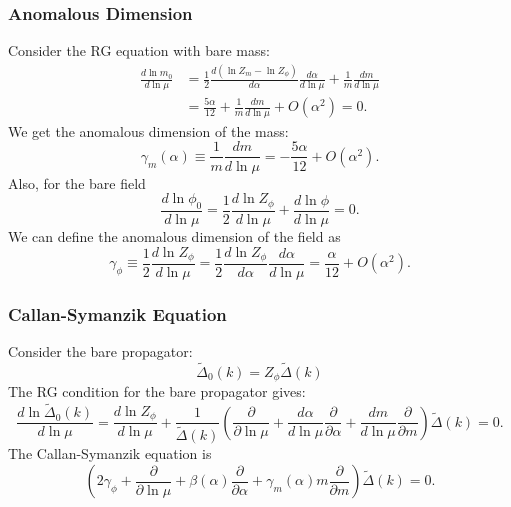 \subsubsection*{Anomalous Dimension}
Consider the RG equation with bare mass:
\begin{equation}
\begin{aligned}
\frac{d\ln m_0}{d\ln \mu} 
&= \frac{1}{2}\frac{d(\ln Z_m - \ln Z_\phi)}{d\alpha}\frac{d\alpha}{d\ln\mu}
	+\frac{1}{m}\frac{d m}{d\ln \mu} \\
&= \frac{5\alpha}{12}+\frac{1}{m}\frac{d m}{d\ln \mu} + O(\alpha^2) = 0.
\end{aligned}
\end{equation}
We get the anomalous dimension of the mass:
\begin{equation}
\gamma_m(\alpha) \equiv \frac{1}{m}\frac{d m}{d\ln \mu} 
= -\frac{5\alpha}{12}+O(\alpha^2).
\end{equation}
Also, for the bare field
\begin{equation}
\frac{d\ln\phi_0}{d\ln\mu} = \frac{1}{2} \frac{d\ln Z_{\phi}}{d\ln\mu} 
+ \frac{d\ln\phi}{d\ln\mu} = 0.
\end{equation}
We can define the anomalous dimension of the field as
\begin{equation}
\gamma_{\phi} \equiv \frac{1}{2}\frac{d \ln Z_\phi}{d\ln\mu}
= \frac{1}{2}\frac{d \ln Z_\phi}{d\alpha}\frac{d\alpha}{d\ln\mu}
= \frac{\alpha}{12} +O(\alpha^2).
\end{equation}



\subsubsection*{Callan-Symanzik Equation}
Consider the bare propagator:
\begin{equation}
\tilde{\Delta}_0(k) = Z_\phi \tilde{\Delta}(k)
\end{equation}
The RG condition for the bare propagator gives:
\begin{equation*}
\frac{d\ln\tilde{\Delta}_0(k)}{d \ln\mu}
=\frac{d\ln Z_\phi}{d\ln\mu}+\frac{1}{\tilde{\Delta}(k)}\left(
	\frac{\partial}{\partial\ln\mu} +
	\frac{d\alpha}{d\ln\mu}\frac{\partial}{\partial\alpha} +
	\frac{dm}{d\ln\mu}\frac{\partial}{\partial m}
\right)\tilde{\Delta}(k)=0.
\end{equation*}
The Callan-Symanzik equation is
\begin{equation}
	\left(
	2\gamma_\phi+
	\frac{\partial}{\partial\ln\mu} +
	\beta(\alpha)\frac{\partial}{\partial\alpha} +
	\gamma_m(\alpha)m\frac{\partial}{\partial m}
\right)\tilde{\Delta}(k)=0.
\end{equation}

